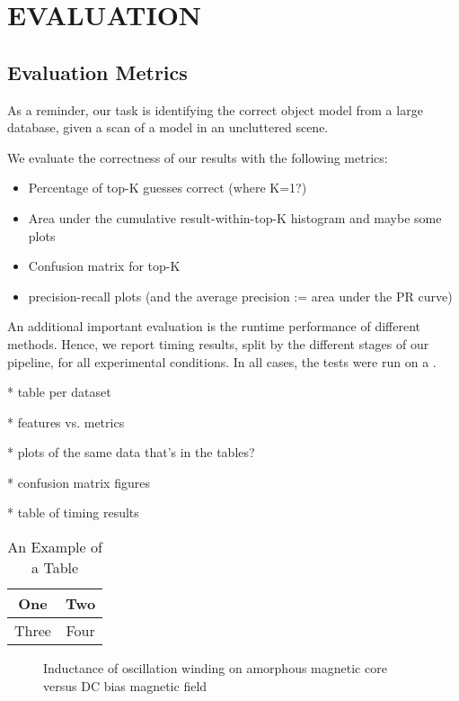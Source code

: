 \section{EVALUATION}

\subsection{Evaluation Metrics}
As a reminder, our task is identifying the correct object model from a large database, given a scan of a model in an uncluttered scene.

We evaluate the correctness of our results with the following metrics:
\begin{itemize}
  \item Percentage of top-K guesses correct (where K=1?)
  \item Area under the cumulative result-within-top-K histogram and maybe some plots
  \item Confusion matrix for top-K
  \item precision-recall plots (and the average precision := area under the PR curve)
\end{itemize}

An additional important evaluation is the runtime performance of different methods.
Hence, we report timing results, split by the different stages of our pipeline, for all experimental conditions.
In all cases, the tests were run on a .

* table per dataset

* features vs. metrics

* plots of the same data that's in the tables?

* confusion matrix figures

* table of timing results

\begin{table}
\caption{An Example of a Table}
\label{table_example}
\begin{center}
\begin{tabular}{|c||c|}
\hline
One & Two\\
\hline
Three & Four\\
\hline
\end{tabular}
\end{center}
\end{table}

\begin{figure}[thpb]
   \centering
   \caption{Inductance of oscillation winding on amorphous
    magnetic core versus DC bias magnetic field}
   \label{figurelabel}
\end{figure}
